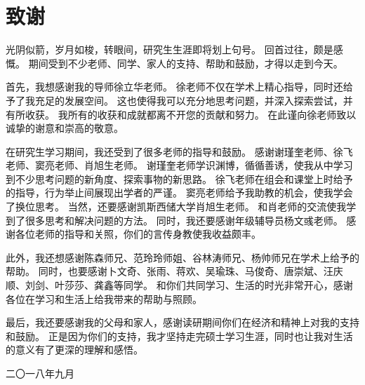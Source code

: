 \chapter*{ 致\qquad 谢}



光阴似箭，岁月如梭，转眼间，研究生生涯即将划上句号。
回首过往，颇是感慨。
期间受到不少老师、同学、家人的支持、帮助和鼓励，才得以走到今天。

首先，我想感谢我的导师徐立华老师。
徐老师不仅在学术上精心指导，同时还给予了我充足的发展空间。
这也使得我可以充分地思考问题，并深入探索尝试，并有所收获。
我所有的收获和成就都离不开您的贡献和努力。
在此谨向徐老师致以诚挚的谢意和崇高的敬意。




在研究生学习期间，我还受到了很多老师的指导和鼓励。
感谢谢瑾奎老师、徐飞老师、窦亮老师、肖旭生老师。
谢瑾奎老师学识渊博，循循善诱，使我从中学习到不少思考问题的新角度、探索事物的新思路。
徐飞老师在组会和课堂上时给予的指导，行为举止间展现出学者的严谨。
窦亮老师给予我助教的机会，使我学会了换位思考。
当然，还要感谢凯斯西储大学肖旭生老师。
和肖老师的交流使我学到了很多思考和解决问题的方法。
同时，我还要感谢年级辅导员杨文彧老师。
感谢各位老师的指导和关照，你们的言传身教使我收益颇丰。

此外，我还想感谢陈森师兄、范玲玲师姐、谷林涛师兄、杨帅师兄在学术上给予的帮助。
同时，也要感谢卜文奇、张雨、蒋欢、吴瑜珠、马俊奇、唐崇斌、汪庆顺、刘剑、叶莎莎、龚鑫等同学。
和你们共同学习、生活的时光非常开心，感谢各位在学习和生活上给我带来的帮助与照顾。


最后，我还要感谢我的父母和家人，感谢读研期间你们在经济和精神上对我的支持和鼓励。
正是因为你们的支持，我才坚持走完硕士学习生涯，同时也让我对生活的意义有了更深的理解和感悟。

\vspace{1.2cm} 
\begin{flushright}

二〇一八年九月 
\end{flushright}



